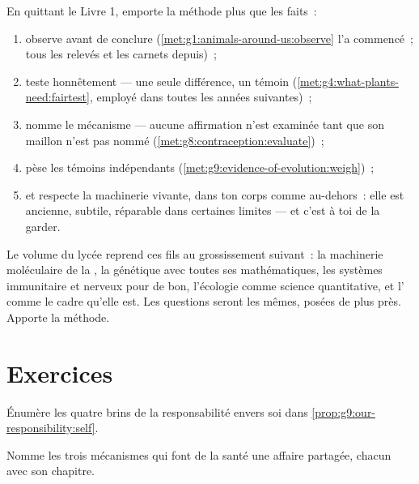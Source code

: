 \begin{method}\label{met:g9:our-responsibility:method}
En quittant le Livre 1, emporte la méthode plus que les faits~:
\begin{enumerate}
  \item observe avant de conclure
        (\cref{met:g1:animals-around-us:observe} l'a
        commencé~; tous les relevés et les carnets depuis)~;
  \item teste honnêtement --- une seule différence, un
        témoin (\cref{met:g4:what-plants-need:fairtest},
        employé dans toutes les années suivantes)~;
  \item nomme le mécanisme --- aucune affirmation n'est
        examinée tant que son maillon n'est pas nommé
        (\cref{met:g8:contraception:evaluate})~;
  \item pèse les témoins indépendants
        (\cref{met:g9:evidence-of-evolution:weigh})~;
  \item et respecte la machinerie vivante, dans ton corps
        comme au-dehors~: elle est ancienne, subtile,
        réparable dans certaines limites --- et c'est à toi
        de la garder.
\end{enumerate}
\end{method}

\begin{remark}\label{rem:g9:our-responsibility:next}
Le volume du lycée reprend ces fils au grossissement
suivant~: la machinerie moléculaire de la , la
génétique avec toutes ses mathématiques, les systèmes
immunitaire et nerveux pour de bon, l'écologie comme science
quantitative, et l' comme le cadre qu'elle est. Les
questions seront les mêmes, posées de plus près. Apporte la
méthode.
\end{remark}

\section{Exercices}

\begin{exercise}[$\star$]\label{exo:g9:our-responsibility:1}
Énumère les quatre brins de la responsabilité envers soi
dans \cref{prop:g9:our-responsibility:self}.
\end{exercise}

\begin{exercise}[$\star$]\label{exo:g9:our-responsibility:2}
Nomme les trois mécanismes qui font de la santé une affaire
partagée, chacun avec son chapitre.
\end{exercise}

